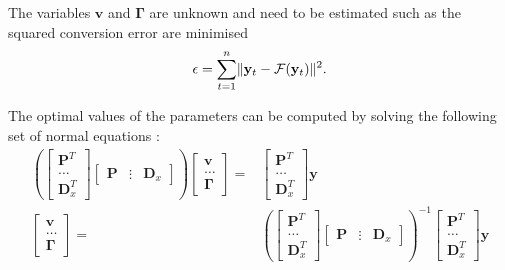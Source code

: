 The variables $\mathbf{v}$ and $\mathbf{\Gamma}$ are unknown and need to be estimated such as the squared conversion error are minimised
\begin{equation}
	\label{eq:conversion_error}
	\epsilon=\sum_{t=1}^{n}\lVert\mathbf{y}_t - \mathcal{F}(\mathbf{y}_t)\rVert^2.
\end{equation}

The optimal values of the parameters can be computed by solving the following set of normal equations \cite{stylianou95}:
\begin{equation}
	\label{eq:param_computed}
	\begin{split}
		\left( 
		\begin{bmatrix}
			\mathbf{P}^T \\
			\dots \\
			\mathbf{D}_x^T
		\end{bmatrix}
		\begin{bmatrix}
			\mathbf{P} & \vdots & \mathbf{D}_x
		\end{bmatrix}
		 \right)
		\begin{bmatrix}
			\mathbf{v} \\
			\dots \\
			\mathbf{\Gamma}
		\end{bmatrix}
		= &
		\begin{bmatrix}
			\mathbf{P}^T \\
			\dots \\
			\mathbf{D}_x^T
		\end{bmatrix}
		\mathbf{y} \\ %
		\begin{bmatrix}
			\mathbf{v} \\
			\dots \\
			\mathbf{\Gamma}
		\end{bmatrix}
		= &
		\left( 
		\begin{bmatrix}
			\mathbf{P}^T \\
			\dots \\
			\mathbf{D}_x^T
		\end{bmatrix}
		\begin{bmatrix}
			\mathbf{P} & \vdots & \mathbf{D}_x
		\end{bmatrix}
		 \right)^{-1}
		\begin{bmatrix}
			\mathbf{P}^T \\
			\dots \\
			\mathbf{D}_x^T
		\end{bmatrix}
		\mathbf{y} \\ %
	\end{split}
\end{equation}
